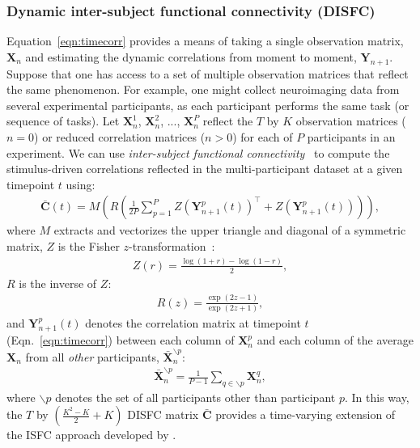 \documentclass[english]{article}
\providecommand{\DIFaddbegin}{} %
\providecommand{\DIFaddend}{} %
\providecommand{\DIFdelbegin}{} %
\providecommand{\DIFdelend}{} %
\newcommand{\DIFscaledelfig}{0.5}
\newlength{\DIFdelgraphicswidth} %
\newlength{\DIFdelgraphicsheight} %
\newcommand{\DIFaddincludegraphics}[2][]{{\color{blue}\fbox{\DIFOincludegraphics[#1]{#2}}}} %
\newcommand{\DIFdelincludegraphics}[2][]{%
\sbox{\DIFdelgraphicsbox}{\DIFOincludegraphics[#1]{#2}}%
\settoboxwidth{\DIFdelgraphicswidth}{\DIFdelgraphicsbox} %
\settoboxtotalheight{\DIFdelgraphicsheight}{\DIFdelgraphicsbox} %
\scalebox{\DIFscaledelfig}{%
\parbox[b]{\DIFdelgraphicswidth}{\usebox{\DIFdelgraphicsbox}\\[-\baselineskip] \rule{\DIFdelgraphicswidth}{0em}}\llap{\resizebox{\DIFdelgraphicswidth}{\DIFdelgraphicsheight}{%
\setlength{\unitlength}{\DIFdelgraphicswidth}%
\begin{picture}(1,1)%
\thicklines\linethickness{2pt} %
{\color[rgb]{1,0,0}\put(0,0){\framebox(1,1){}}}%
{\color[rgb]{1,0,0}\put(0,0){\line( 1,1){1}}}%
{\color[rgb]{1,0,0}\put(0,1){\line(1,-1){1}}}%
\end{picture}%
}\hspace*{3pt}}} %
} %
\DeclareRobustCommand{\DIFaddbegin}{\DIFOaddbegin \let\includegraphics\DIFaddincludegraphics} %
\DeclareRobustCommand{\DIFaddend}{\DIFOaddend \let\includegraphics\DIFOincludegraphics} %
\DeclareRobustCommand{\DIFdelbegin}{\DIFOdelbegin \let\includegraphics\DIFdelincludegraphics} %
\DeclareRobustCommand{\DIFdelend}{\DIFOaddend \let\includegraphics\DIFOincludegraphics} %
\begin{document}
\subsubsection*{Dynamic inter-subject functional connectivity (DISFC)}
Equation~\ref{eqn:timecorr} provides a means of taking a single
observation matrix, $\mathbf{X}_n$ and estimating the dynamic
correlations from moment to moment, $\mathbf{Y}_{n+1}$.  Suppose that
one has access to a set of multiple observation matrices that reflect
the same phenomenon.  For example, one might collect neuroimaging data
from several experimental participants, as each participant performs
the same task (or sequence of tasks).  Let $\mathbf{X}_n^1$,
$\mathbf{X}_n^2$, ..., $\mathbf{X}_n^P$ reflect the $T$ by $K$
observation matrices ($n = 0$) or reduced correlation matrices
($n > 0$) for each of $P$ participants in an experiment.  We can use
\textit{inter-subject functional connectivity}~\DIFdelbegin %
\DIFdelend \DIFaddbegin \citep[ISFC;
][]{SimoEtal16, SimoChan20} \DIFaddend to compute the stimulus-driven correlations reflected
in the multi-participant dataset at a given timepoint $t$ using:
\begin{align}
\bar{\mathbf{C}}(t) = M\left(R\left(\frac{1}{2P} \sum_{p=1}^P
  Z\left(\mathbf{Y}_{n+1}^p(t)\right)^\top + Z\left(\mathbf{Y}_{n+1}^p(t)\right)\right)\right),\label{eqn:disfc}
\end{align}
where $M$ extracts and vectorizes the upper triangle and diagonal of a symmetric
matrix, $Z$ is the Fisher $z$-transformation~\citep{Zar10}:
\begin{align}
Z(r) = \frac{\log(1+r) - \log(1-r)}{2},
\end{align}
$R$ is the inverse of $Z$:
\begin{align}
R(z) = \frac{\exp(2z - 1)}{\exp(2z + 1)},
\end{align}
and $\mathbf{Y}_{n+1}^p(t)$ denotes the correlation matrix at timepoint $t$
(Eqn.~\ref{eqn:timecorr}) between each column of $\mathbf{X}_n^p$ and each
column of the average $\mathbf{X}_n$ from all \textit{other}
participants, $\bar{\mathbf{X}}_n^{ \backslash p}$:
\begin{align}
  \bar{\mathbf{X}}_n^{ \backslash p} = \frac{1}{P-1}\sum_{q \in
  \backslash p} \mathbf{X}_n^q,
\end{align}
where $\backslash p$ denotes the set of all participants other than
participant $p$. In this way, the $T$ by $\left( \frac{K^2 - K}{2} + K \right)$ DISFC
matrix $\bar{\mathbf{C}}$ provides a time-varying extension of the ISFC
approach developed by \cite{SimoEtal16}.
\end{document}
